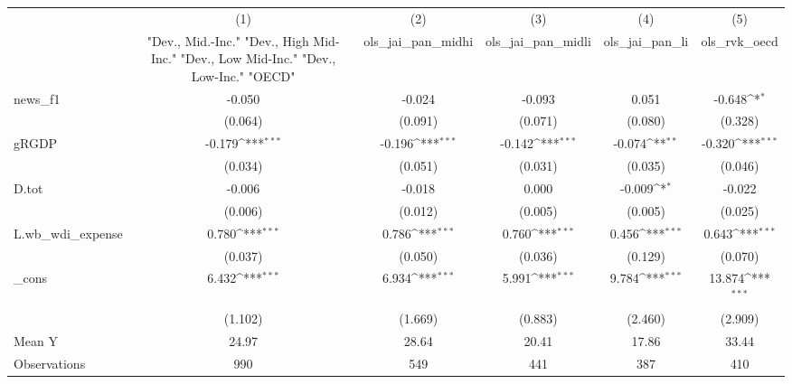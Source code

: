{
\def\sym#1{\ifmmode^{#1}\else\(^{#1}\)\fi}
\begin{tabular}{l*{5}{c}}
\toprule
            &\multicolumn{1}{c}{(1)}&\multicolumn{1}{c}{(2)}&\multicolumn{1}{c}{(3)}&\multicolumn{1}{c}{(4)}&\multicolumn{1}{c}{(5)}\\
            &\multicolumn{1}{c}{ "Dev., Mid.-Inc." "Dev., High Mid-Inc." "Dev., Low Mid-Inc." "Dev., Low-Inc." "OECD" }&\multicolumn{1}{c}{ols\_jai\_pan\_midhi}&\multicolumn{1}{c}{ols\_jai\_pan\_midli}&\multicolumn{1}{c}{ols\_jai\_pan\_li}&\multicolumn{1}{c}{ols\_rvk\_oecd}\\
\midrule
news\_f1     &      -0.050         &      -0.024         &      -0.093         &       0.051         &      -0.648\sym{*}  \\
            &     (0.064)         &     (0.091)         &     (0.071)         &     (0.080)         &     (0.328)         \\
\addlinespace
gRGDP       &      -0.179\sym{***}&      -0.196\sym{***}&      -0.142\sym{***}&      -0.074\sym{**} &      -0.320\sym{***}\\
            &     (0.034)         &     (0.051)         &     (0.031)         &     (0.035)         &     (0.046)         \\
\addlinespace
D.tot       &      -0.006         &      -0.018         &       0.000         &      -0.009\sym{*}  &      -0.022         \\
            &     (0.006)         &     (0.012)         &     (0.005)         &     (0.005)         &     (0.025)         \\
\addlinespace
L.wb\_wdi\_expense&       0.780\sym{***}&       0.786\sym{***}&       0.760\sym{***}&       0.456\sym{***}&       0.643\sym{***}\\
            &     (0.037)         &     (0.050)         &     (0.036)         &     (0.129)         &     (0.070)         \\
\addlinespace
\_cons      &       6.432\sym{***}&       6.934\sym{***}&       5.991\sym{***}&       9.784\sym{***}&      13.874\sym{***}\\
            &     (1.102)         &     (1.669)         &     (0.883)         &     (2.460)         &     (2.909)         \\
\midrule
Mean Y      &       24.97         &       28.64         &       20.41         &       17.86         &       33.44         \\
Observations&         990         &         549         &         441         &         387         &         410         \\
\bottomrule
\end{tabular}
}
